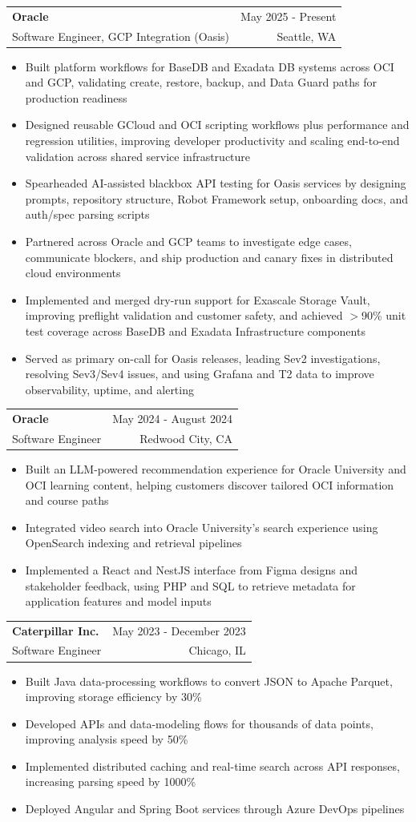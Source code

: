 \documentclass[letterpaper,11pt]{article}
\makeatletter
\newcommand{\resumeItem}[1]{
  \item\small{
    {#1 \vspace{-2pt}}
  }
}
\newcommand{\resumeSubheading}[4]{
  \vspace{-2pt}\item
    \begin{tabular*}{0.97\textwidth}[t]{l@{\extracolsep{\fill}}r}
      \textbf{#1} & #2 \\
      {\small#3} & {\small #4} \\
    \end{tabular*}\vspace{-7pt}
}
\newcommand{\resumeItemListStart}{\begin{itemize}}
\newcommand{\resumeItemListEnd}{\end{itemize}\vspace{-5pt}}
\makeatother
\begin{document}
    \resumeSubheading
  {Oracle}{May 2025 - Present}
  {Software Engineer, GCP Integration (Oasis)}{Seattle, WA}
  \resumeItemListStart
    \resumeItem{Built platform workflows for BaseDB and Exadata DB systems across OCI and GCP, validating create, restore, backup, and Data Guard paths for production readiness}
    \resumeItem{Designed reusable GCloud and OCI scripting workflows plus performance and regression utilities, improving developer productivity and scaling end-to-end validation across shared service infrastructure}
    \resumeItem{Spearheaded AI-assisted blackbox API testing for Oasis services by designing prompts, repository structure, Robot Framework setup, onboarding docs, and auth/spec parsing scripts}
    \resumeItem{Partnered across Oracle and GCP teams to investigate edge cases, communicate blockers, and ship production and canary fixes in distributed cloud environments}
    \resumeItem{Implemented and merged dry-run support for Exascale Storage Vault, improving preflight validation and customer safety, and achieved $>$90\% unit test coverage across BaseDB and Exadata Infrastructure components}
    \resumeItem{Served as primary on-call for Oasis releases, leading Sev2 investigations, resolving Sev3/Sev4 issues, and using Grafana and T2 data to improve observability, uptime, and alerting}
  \resumeItemListEnd

    \resumeSubheading
      {Oracle}{May 2024 - August 2024}
      {Software Engineer}{Redwood City, CA}
      \resumeItemListStart
        \resumeItem{Built an LLM-powered recommendation experience for Oracle University and OCI learning content, helping customers discover tailored OCI information and course paths}
        \resumeItem{Integrated video search into Oracle University's search experience using OpenSearch indexing and retrieval pipelines}
        \resumeItem{Implemented a React and NestJS interface from Figma designs and stakeholder feedback, using PHP and SQL to retrieve metadata for application features and model inputs}
      \resumeItemListEnd

    \resumeSubheading
      {Caterpillar Inc.}{May 2023 - December 2023}
      {Software Engineer}{Chicago, IL}
      \resumeItemListStart
        \resumeItem{Built Java data-processing workflows to convert JSON to Apache Parquet, improving storage efficiency by 30\%}
        \resumeItem{Developed APIs and data-modeling flows for thousands of data points, improving analysis speed by 50\%}
        \resumeItem{Implemented distributed caching and real-time search across API responses, increasing parsing speed by 1000\%}
        \resumeItem{Deployed Angular and Spring Boot services through Azure DevOps pipelines}
      \resumeItemListEnd
\end{document}

